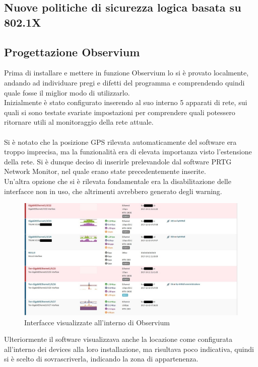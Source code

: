 \documentclass[Tesi.tex]{subfiles}
\begin{document}
\subsection{Nuove politiche di sicurezza logica basata su 802.1X}

\subsection{Progettazione Observium}
Prima di installare e mettere in funzione Observium lo si è provato localmente, andando ad individuare pregi e difetti del programma e comprendendo quindi quale fosse il miglior modo di utilizzarlo.\\
Inizialmente è stato configurato inserendo al suo interno 5 apparati di rete, sui quali si sono testate svariate impostazioni per comprendere quali potessero ritornare utili al monitoraggio della rete attuale.\\\\
Si è notato che la posizione GPS rilevata automaticamente del software era troppo imprecisa, ma la funzionalità era di elevata importanza visto l'estensione della rete. Si è dunque deciso di inserirle prelevandole dal software PRTG Network Monitor, nel quale erano state precedentemente inserite. \\
Un'altra opzione che si è rilevata fondamentale era la disabilitazione delle interfacce non in uso, che altrimenti avrebbero generato degli warning. \\
\begin{figure}[H]
	\centering
	\includegraphics[width=1\linewidth]{"images/Observium_porte"}
	\caption{Interfacce visualizzate all'interno di Observium}
	\label{fig:Interfacce visualizzate all'interno di Observium}
\end{figure}
Ulteriormente il software visualizzava anche la locazione come configurata all'interno dei devices alla loro installazione, ma risultava poco indicativa, quindi si è scelto di sovrascriverla, indicando la zona di appartenenza.
\end{document}
